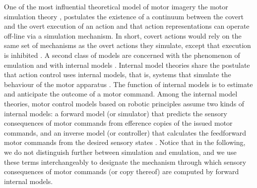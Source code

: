 \documentclass[utf8]{template/frontiersSCNS} %
\begin{document}
One of the most influential theoretical model of motor imagery the motor simulation theory \cite{jeannerod_origin_2006, jeannerod_representing_1994, jeannerod_neural_2001}, postulates the existence of a continuum between the covert and the overt execution of an action and that action representations can operate off-line via a simulation mechanism. In short, covert actions would rely on the same set of mechanisms as the overt actions they simulate, except that execution is inhibited \citep{oshea_does_2017}. A second class of models are concerned with the phenomenon of emulation \citep{grush_emulation_2004} and with internal models \cite[for a review of the similarities and dissimilarities between simulation and emulation models, see][]{gentsch_towards_2016}. Internal model theories share the postulate that action control uses internal models, that is, systems that simulate the behaviour of the motor apparatus \citep[e.g.,][]{jordan_forward_1992, kawato_hierarchical_1987}. The function of internal models is to estimate and anticipate the outcome of a motor command. Among the internal model theories, motor control models based on robotic principles \citep[e.g.,][]{kawato_internal_1999, wolpert_internal_1995} assume two kinds of internal models: a forward model (or simulator) that predicts the sensory consequences of motor commands from efference copies of the issued motor commands, and an inverse model (or controller) that calculates the feedforward motor commands from the desired sensory states \citep{gentsch_towards_2016, loevenbruck_cognitive_2018}. Notice that in the following, we do not distinguish further between simulation and emulation, and we use these terms interchangeably to designate the mechanism through which sensory consequences of motor commands (or copy thereof) are computed by forward internal models.

\end{document}
